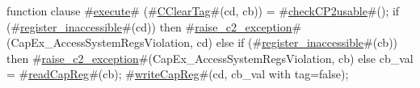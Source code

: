 function clause #\hyperref[zexecute]{execute}# (#\hyperref[zCClearTag]{CClearTag}#(cd, cb)) =
{
  #\hyperref[zcheckCPtwousable]{checkCP2usable}#();
  if (#\hyperref[zregisterzyinaccessible]{register\_inaccessible}#(cd)) then
    #\hyperref[zraisezyctwozyexception]{raise\_c2\_exception}#(CapEx_AccessSystemRegsViolation, cd)
  else if (#\hyperref[zregisterzyinaccessible]{register\_inaccessible}#(cb)) then
    #\hyperref[zraisezyctwozyexception]{raise\_c2\_exception}#(CapEx_AccessSystemRegsViolation, cb)
  else
    {
      cb_val = #\hyperref[zreadCapReg]{readCapReg}#(cb);
      #\hyperref[zwriteCapReg]{writeCapReg}#(cd, {cb_val with tag=false});
    }
}
